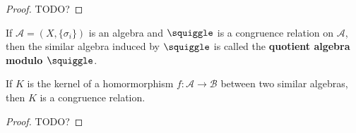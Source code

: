 \begin{proof}
TODO?

\end{proof}


\begin{definition}
\label{def-quotient-algebra}

If $\mathcal{A} = (X, \{\sigma_i\})$ is an algebra and $\squiggle$ is a congruence relation on $\mathcal{A}$, then the similar algebra induced by $\squiggle$ is called the \textbf{quotient algebra modulo $\squiggle$}.

\end{definition}


\begin{proposition}
\label{prop-kernel-is-congrel}

If $K$ is the kernel of a homormorphism $f: \mathcal{A} \rightarrow \mathcal{B}$ between two similar algebras, then $K$ is a congruence relation.

\end{proposition}

\begin{proof}
TODO?

\end{proof}


